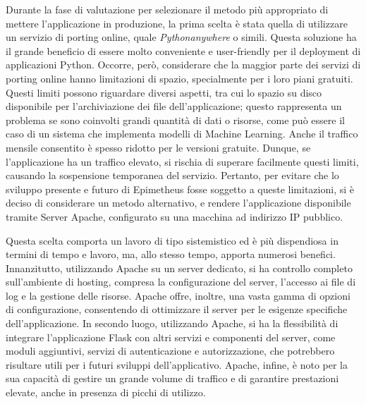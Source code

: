 Durante la fase di valutazione per selezionare il metodo più appropriato di mettere l'applicazione in produzione, la prima scelta è stata quella di utilizzare un servizio di porting online, quale \textit{Pythonanywhere} o simili. Questa soluzione ha il grande beneficio di essere molto conveniente e user-friendly per il deployment di applicazioni Python.
\newline
Occorre, però, considerare che la maggior parte dei servizi di porting online hanno limitazioni di spazio, specialmente per i loro piani gratuiti. Questi limiti possono riguardare diversi aspetti, tra cui lo spazio su disco disponibile per l'archiviazione dei file dell'applicazione; questo rappresenta un problema se sono coinvolti grandi quantità di dati o risorse, come può essere il caso di un sistema che implementa modelli di Machine Learning.
\newline
Anche il traffico mensile consentito è spesso ridotto per le versioni gratuite. Dunque, se l'applicazione ha un traffico elevato, si rischia di superare facilmente questi limiti, causando la sospensione temporanea del servizio.
\newline
Pertanto, per evitare che lo sviluppo presente e futuro di Epimetheus fosse soggetto a queste limitazioni, si è deciso di considerare un metodo alternativo, e rendere l’applicazione disponibile tramite Server Apache, configurato su una macchina ad indirizzo IP pubblico.

Questa scelta comporta un lavoro di tipo sistemistico ed è più dispendiosa in termini di tempo e lavoro, ma, allo stesso tempo, apporta numerosi benefici.
\newline
Innanzitutto, utilizzando Apache su un server dedicato, si ha controllo completo sull'ambiente di hosting, compresa la configurazione del server, l'accesso ai file di log e la gestione delle risorse. Apache offre, inoltre, una vasta gamma di opzioni di configurazione, consentendo di ottimizzare il server per le esigenze specifiche dell'applicazione. 
\newline
In secondo luogo, utilizzando Apache, si ha la flessibilità di integrare l'applicazione Flask con altri servizi e componenti del server, come moduli aggiuntivi, servizi di autenticazione e autorizzazione, che potrebbero risultare utili per i futuri sviluppi dell'applicativo.
\newline
Apache, infine, è noto per la sua capacità di gestire un grande volume di traffico e di garantire prestazioni elevate, anche in presenza di picchi di utilizzo.

